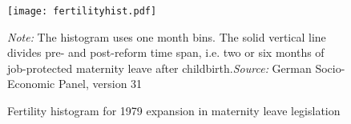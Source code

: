 \documentclass[a4paper ]{article}
\begin{document}
\bigskip
\begin{figure}[h]
\centering
\texttt{[image: fertilityhist.pdf]}
\caption{Fertility histogram for 1979 expansion in maternity leave legislation}\label{fig: fertilityhist_treated}
\begin{minipage}{\textwidth} %
{\footnotesize \textit{Note:} The histogram uses one month bins. The solid vertical line divides pre- and post-reform time span, i.e. two or six months of job-protected maternity leave after childbirth.\newline \textit{Source: }German Socio-Economic Panel, version 31\par}
\end{minipage}
\end{figure}
\end{document}
